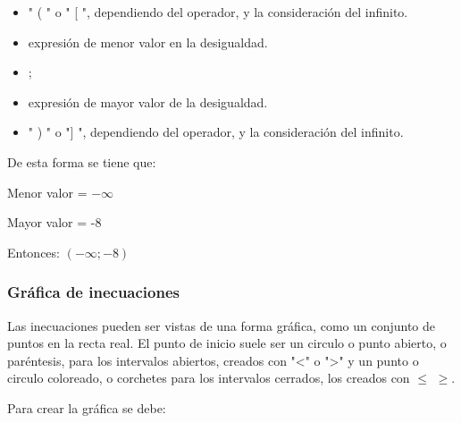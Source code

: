 \documentclass[12pt]{article}
\begin{document}
    \begin{itemize}
        \item " ( " o " [ ", dependiendo del operador, y la consideración del infinito.
        \item expresión de menor valor en la desigualdad.
        \item ;
        \item expresión de mayor valor de la desigualdad.
        \item " ) " o "] ", dependiendo del operador, y la consideración del infinito.
    \end{itemize}

    De esta forma se tiene que:

    Menor valor = $-\infty$

    Mayor valor = -8

    Entonces: $(-\infty;-8)$

\subsubsection{Gráfica de inecuaciones} \label{Grafica-inecuaciones}

    Las inecuaciones pueden ser vistas de una forma gráfica, como un
    conjunto de puntos en la recta real. El punto de inicio suele ser un circulo
    o punto abierto, o paréntesis, para los intervalos abiertos, creados con "<" o ">"
    y un punto o circulo coloreado, o corchetes para los intervalos cerrados, los
    creados con $ \leq $ $ \geq $.

    Para crear la gráfica se debe:
\end{document}
